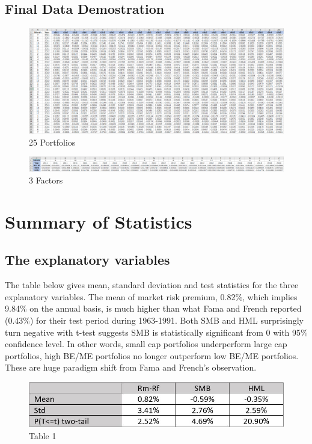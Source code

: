 \documentclass[12pt]{article}
\begin{document}
\subsection{Final Data Demostration}
\begin{figure}[ht]
	\centering
	\includegraphics[scale=0.5]{1.png}
	\caption*{25 Portfolios}
	\label{fig:label}
\end{figure}
\begin{figure}[ht]
	\centering
	\includegraphics[scale=0.47]{2.png}
	\caption*{3 Factors}
	\label{fig:label}
\end{figure}


\section{Summary of Statistics}
\subsection{The explanatory variables}

The table below gives mean, standard deviation and test statistics for the three explanatory variables. The mean of market risk premium, 0.82\%, which implies 9.84\% on the annual basis, is much higher than what Fama and French reported (0.43\%) for their test period during 1963-1991. Both SMB and HML surprisingly turn negative with t-test suggests SMB is statistically significant from 0 with 95\% confidence level. In other words, small cap portfolios underperform large cap portfolios, high BE/ME portfolios no longer outperform low BE/ME portfolios. These are huge paradigm shift from Fama and French’s observation.


\begin{figure}[h]
	\centering
	\includegraphics[width=0.5\linewidth]{1.JPG}
	\caption*{Table 1}
	\label{fig:label}
\end{figure}
\end{document}

